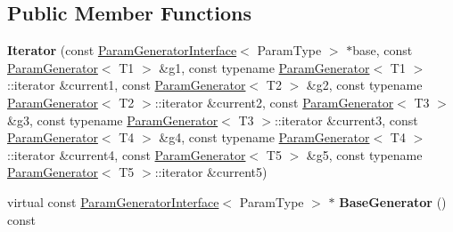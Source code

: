 \subsection*{Public Member Functions}
\begin{DoxyCompactItemize}
\item 
\mbox{\label{classtesting_1_1internal_1_1_cartesian_product_generator5_1_1_iterator_a2a05b3402c71da0e36896cf31cb47fe8}} 
{\bfseries Iterator} (const \mbox{\hyperlink{classtesting_1_1internal_1_1_param_generator_interface}{Param\+Generator\+Interface}}$<$ Param\+Type $>$ $\ast$base, const \mbox{\hyperlink{classtesting_1_1internal_1_1_param_generator}{Param\+Generator}}$<$ T1 $>$ \&g1, const typename \mbox{\hyperlink{classtesting_1_1internal_1_1_param_generator}{Param\+Generator}}$<$ T1 $>$\+::iterator \&current1, const \mbox{\hyperlink{classtesting_1_1internal_1_1_param_generator}{Param\+Generator}}$<$ T2 $>$ \&g2, const typename \mbox{\hyperlink{classtesting_1_1internal_1_1_param_generator}{Param\+Generator}}$<$ T2 $>$\+::iterator \&current2, const \mbox{\hyperlink{classtesting_1_1internal_1_1_param_generator}{Param\+Generator}}$<$ T3 $>$ \&g3, const typename \mbox{\hyperlink{classtesting_1_1internal_1_1_param_generator}{Param\+Generator}}$<$ T3 $>$\+::iterator \&current3, const \mbox{\hyperlink{classtesting_1_1internal_1_1_param_generator}{Param\+Generator}}$<$ T4 $>$ \&g4, const typename \mbox{\hyperlink{classtesting_1_1internal_1_1_param_generator}{Param\+Generator}}$<$ T4 $>$\+::iterator \&current4, const \mbox{\hyperlink{classtesting_1_1internal_1_1_param_generator}{Param\+Generator}}$<$ T5 $>$ \&g5, const typename \mbox{\hyperlink{classtesting_1_1internal_1_1_param_generator}{Param\+Generator}}$<$ T5 $>$\+::iterator \&current5)
\item 
\mbox{\label{classtesting_1_1internal_1_1_cartesian_product_generator5_1_1_iterator_a297d906821c33c375415d092ccdb1c0c}} 
virtual const \mbox{\hyperlink{classtesting_1_1internal_1_1_param_generator_interface}{Param\+Generator\+Interface}}$<$ Param\+Type $>$ $\ast$ {\bfseries Base\+Generator} () const
\item 
\mbox{\label{classtesting_1_1internal_1_1_cartesian_product_generator5_1_1_iterator_a57204944c81a14f57d5e59d33ab82024}} 

\end{DoxyCompactItemize}
